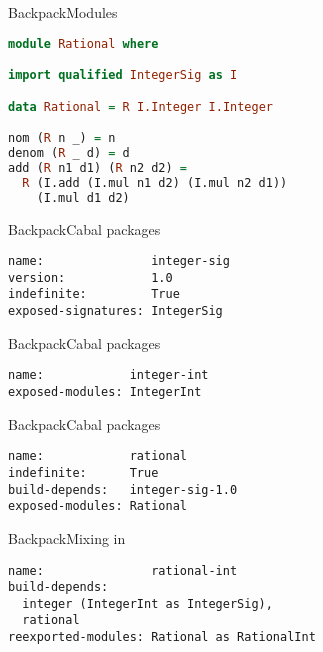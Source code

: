 \documentclass{beamer}
\begin{document}
\begin{frame}[fragile]{Backpack}{Modules}
\begin{lstlisting}[language=Haskell]
module Rational where

import qualified IntegerSig as I

data Rational = R I.Integer I.Integer

nom (R n _) = n
denom (R _ d) = d
add (R n1 d1) (R n2 d2) =
  R (I.add (I.mul n1 d2) (I.mul n2 d1))
    (I.mul d1 d2)
\end{lstlisting}
\end{frame}

\begin{frame}[fragile]{Backpack}{Cabal packages}
\begin{lstlisting}[language=Cabal,title=Integer signature package]
name:               integer-sig
version:            1.0
indefinite:         True
exposed-signatures: IntegerSig
\end{lstlisting}
\end{frame}

\begin{frame}[fragile]{Backpack}{Cabal packages}
\begin{lstlisting}[language=Cabal,title=Integer implementation package]
name:            integer-int
exposed-modules: IntegerInt
\end{lstlisting}
\end{frame}

\begin{frame}[fragile]{Backpack}{Cabal packages}
\begin{lstlisting}[language=Cabal,title=Rational ``functor'' package]
name:            rational
indefinite:      True
build-depends:   integer-sig-1.0
exposed-modules: Rational
\end{lstlisting}
\end{frame}

\begin{frame}[fragile]{Backpack}{Mixing in}
\begin{lstlisting}[language=Cabal,title=Rationals based on Integers]
name:               rational-int
build-depends:
  integer (IntegerInt as IntegerSig),
  rational
reexported-modules: Rational as RationalInt
\end{lstlisting}
\end{frame}
\end{document}
